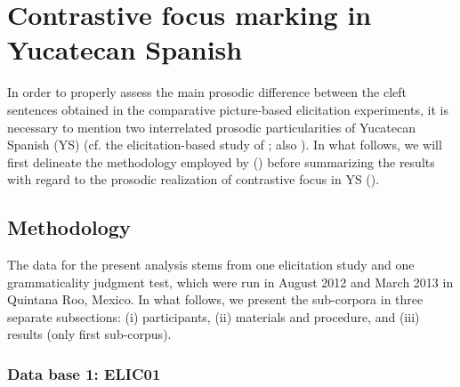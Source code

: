 \documentclass[output=paper]{langsci/langscibook}
\begin{document}
\section{Contrastive focus marking in Yucatecan Spanish}
\label{sec:uth:3}
In order to properly assess the main prosodic difference between the cleft sentences obtained in the comparative picture-based elicitation experiments, it is necessary to mention two interrelated prosodic particularities of Yucatecan Spanish (YS) (cf. the elicitation-based study of \citealt{Uth16}; also \citealt{GriceUth15}). In what follows, we will first delineate the methodology employed by \citet{Uth16} () before summarizing the results with regard to the prosodic realization of contrastive focus in YS  (). 
  
\subsection{Methodology}
\label{sec:uth:3.1}
The data for the present analysis stems from one elicitation study and one grammaticality judgment test, which were run in August 2012 and March 2013 in Quintana Roo, Mexico. In what follows, we present the sub-corpora in three separate subsections: (i) participants, (ii) materials and procedure, and (iii) results (only first sub-corpus).

\subsubsection{Data base 1: ELIC01}
\label{sec:uth:3.2}
\end{document}
